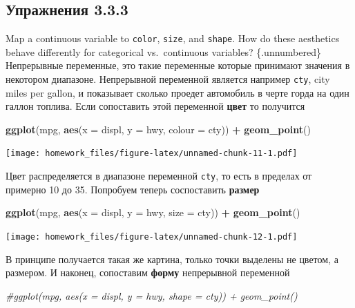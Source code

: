 \documentclass[]{book}
\newenvironment{Shaded}{\begin{snugshade}}{\end{snugshade}}
\newcommand{\KeywordTok}[1]{\textcolor[rgb]{0.13,0.29,0.53}{\textbf{#1}}}
\newcommand{\DataTypeTok}[1]{\textcolor[rgb]{0.13,0.29,0.53}{#1}}
\newcommand{\StringTok}[1]{\textcolor[rgb]{0.31,0.60,0.02}{#1}}
\newcommand{\CommentTok}[1]{\textcolor[rgb]{0.56,0.35,0.01}{\textit{#1}}}
\newcommand{\OperatorTok}[1]{\textcolor[rgb]{0.81,0.36,0.00}{\textbf{#1}}}
\newcommand{\NormalTok}[1]{#1}
\begin{document}
\subsection*{Упражнения 3.3.3}\label{-3.3.3}

Map a continuous variable to \texttt{color}, \texttt{size}, and
\texttt{shape}. How do these aesthetics behave differently for
categorical vs.~continuous variables? \{.unnumbered\} Непрерывные
переменные, это такие переменные которые принимают значения в некотором
диапазоне. Непрерывной переменной является например \texttt{cty}, city
miles per gallon, и показывает сколько проедет автомобиль в черте горда
на один галлон топлива. Если сопоставить этой переменной \textbf{цвет}
то получится

\begin{Shaded}
\begin{Highlighting}[]
\KeywordTok{ggplot}\NormalTok{(mpg, }\KeywordTok{aes}\NormalTok{(}\DataTypeTok{x =}\NormalTok{ displ, }\DataTypeTok{y =}\NormalTok{ hwy, }\DataTypeTok{colour =}\NormalTok{ cty)) }\OperatorTok{+}
\StringTok{   }\KeywordTok{geom_point}\NormalTok{()}
\end{Highlighting}
\end{Shaded}

\texttt{[image: homework\_files/figure-latex/unnamed-chunk-11-1.pdf]}

Цвет распределяется в диапазоне переменной \texttt{cty}, то есть в
пределах от примерно 10 до 35. Попробуем теперь соспоставить
\textbf{размер}

\begin{Shaded}
\begin{Highlighting}[]
\KeywordTok{ggplot}\NormalTok{(mpg, }\KeywordTok{aes}\NormalTok{(}\DataTypeTok{x =}\NormalTok{ displ, }\DataTypeTok{y =}\NormalTok{ hwy, }\DataTypeTok{size =}\NormalTok{ cty)) }\OperatorTok{+}
\StringTok{   }\KeywordTok{geom_point}\NormalTok{()}
\end{Highlighting}
\end{Shaded}

\texttt{[image: homework\_files/figure-latex/unnamed-chunk-12-1.pdf]}

В принципе получается такая же картина, только точки выделены не цветом,
а размером. И наконец, сопоставим \textbf{форму} непрерывной переменной

\begin{Shaded}
\begin{Highlighting}[]
\CommentTok{#ggplot(mpg, aes(x = displ, y = hwy, shape = cty)) + geom_point()}
\end{Highlighting}
\end{Shaded}
\end{document}

